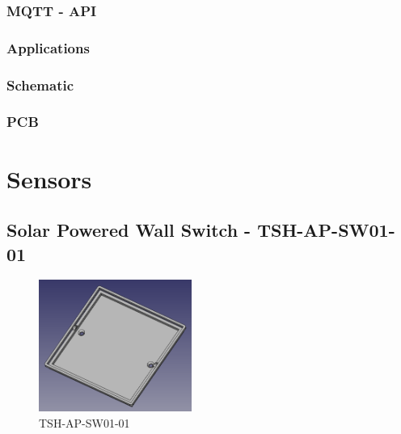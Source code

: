 \documentclass[]{scrreprt}%
\begin{document}
\subsubsection{MQTT - API}

\subsubsection{Applications}

\subsubsection{Schematic}

\subsubsection{PCB}


\section{Sensors}

\newpage
\subsection{Solar Powered Wall Switch - TSH-AP-SW01-01}

\begin{figure}[htb]
  \centering
  \label{img:TSH-AP-SW01-01}
  \includegraphics[width=50mm]{img/mod/TSH-AP-SW01-01.png}
  \caption{TSH-AP-SW01-01}
\end{figure}
% 
\end{document}
